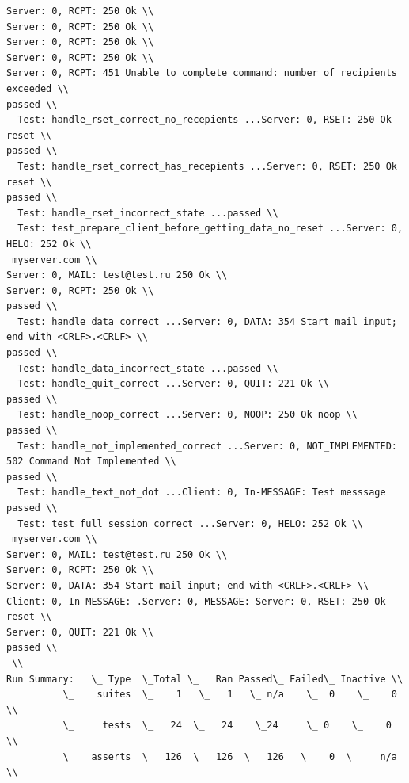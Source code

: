 \documentclass[a4paper,12pt]{report}
\begin{document}
\begin{verbatim}
Server: 0, RCPT: 250 Ok \\
Server: 0, RCPT: 250 Ok \\
Server: 0, RCPT: 250 Ok \\
Server: 0, RCPT: 250 Ok \\
Server: 0, RCPT: 451 Unable to complete command: number of recipients exceeded \\
passed \\
  Test: handle_rset_correct_no_recepients ...Server: 0, RSET: 250 Ok reset \\
passed \\
  Test: handle_rset_correct_has_recepients ...Server: 0, RSET: 250 Ok reset \\
passed \\
  Test: handle_rset_incorrect_state ...passed \\
  Test: test_prepare_client_before_getting_data_no_reset ...Server: 0, HELO: 252 Ok \\
 myserver.com \\
Server: 0, MAIL: test@test.ru 250 Ok \\
Server: 0, RCPT: 250 Ok \\
passed \\
  Test: handle_data_correct ...Server: 0, DATA: 354 Start mail input; end with <CRLF>.<CRLF> \\
passed \\
  Test: handle_data_incorrect_state ...passed \\
  Test: handle_quit_correct ...Server: 0, QUIT: 221 Ok \\
passed \\
  Test: handle_noop_correct ...Server: 0, NOOP: 250 Ok noop \\
passed \\
  Test: handle_not_implemented_correct ...Server: 0, NOT_IMPLEMENTED: 502 Command Not Implemented \\
passed \\
  Test: handle_text_not_dot ...Client: 0, In-MESSAGE: Test messsage passed \\
  Test: test_full_session_correct ...Server: 0, HELO: 252 Ok \\
 myserver.com \\
Server: 0, MAIL: test@test.ru 250 Ok \\
Server: 0, RCPT: 250 Ok \\
Server: 0, DATA: 354 Start mail input; end with <CRLF>.<CRLF> \\
Client: 0, In-MESSAGE: .Server: 0, MESSAGE: Server: 0, RSET: 250 Ok reset \\
Server: 0, QUIT: 221 Ok \\
passed \\
 \\
Run Summary:   \_ Type  \_Total \_   Ran Passed\_ Failed\_ Inactive \\
          \_    suites  \_    1   \_   1   \_ n/a    \_  0    \_    0 \\
          \_     tests  \_   24  \_   24    \_24     \_ 0    \_    0 \\
          \_   asserts  \_  126  \_  126  \_  126   \_   0  \_    n/a \\


\end{verbatim}
\end{document}
